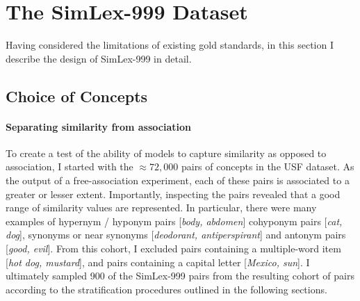 
\section{The SimLex-999 Dataset} 
\label{simlex}

Having considered the limitations of existing gold standards, in this section I describe the design of SimLex-999 in detail. 

\subsection{Choice of Concepts}

\paragraph{Separating similarity from association}To create a test of the ability of models to capture similarity as opposed to association, I started with the \(\approx 72,000\) pairs of concepts in the USF dataset. As the output of a free-association experiment, each of these pairs is associated to a greater or lesser extent. Importantly, inspecting the pairs revealed that a good range of similarity values are represented. In particular, there were many examples of hypernym / hyponym pairs [\emph{body, abdomen}] cohyponym pairs [\emph{cat, dog}], synonyms or near synonyms [\emph{deodorant, antiperspirant}] and antonym pairs [\emph{good, evil}]. From this cohort, I excluded pairs containing a multiple-word item [\emph{hot dog, mustard}], and pairs containing a capital letter [\emph{Mexico, sun}]. I ultimately sampled 900 of the SimLex-999 pairs from the resulting cohort of pairs according to the stratification procedures outlined in the following sections. 


